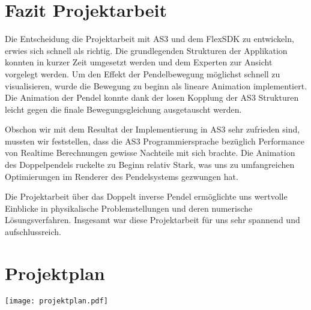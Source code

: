 \documentclass[12pt]{article}
\numberwithin{equation}{subsection}
\begin{document}
\newpage
\section{Fazit Projektarbeit}
Die Entscheidung die Projektarbeit mit AS3 und dem FlexSDK zu entwickeln, erwies sich schnell als richtig. Die grundlegenden Strukturen der Applikation konnten in kurzer Zeit umgesetzt werden und dem Experten zur Ansicht vorgelegt werden. Um den Effekt der Pendelbewegung  möglichst schnell zu visualisieren, wurde die Bewegung zu beginn als lineare Animation implementiert. Die Animation der Pendel konnte dank der losen Kopplung der AS3 Strukturen leicht gegen die finale Bewegungsgleichung ausgetauscht werden.

Obschon wir mit dem Resultat der Implementierung in AS3 sehr zufrieden sind, mussten wir feststellen, dass die AS3 Programmiersprache bezüglich Performance von Realtime Berechnungen gewisse Nachteile mit sich brachte. Die Animation des Doppelpendels ruckelte zu Beginn relativ Stark, was uns zu umfangreichen Optimierungen im Renderer des Pendelsystems gezwungen hat.

Die Projektarbeit über das Doppelt inverse Pendel ermöglichte uns wertvolle Einblicke in physikalische Problemstellungen und deren numerische Lösungsverfahren. Insgesamt war diese Projektarbeit für uns sehr spannend und aufschlussreich.

\newpage
\listoffigures

\newpage
\nocite{*}



\appendix
\section{Projektplan}
\texttt{[image: projektplan.pdf]}
\end{document}
